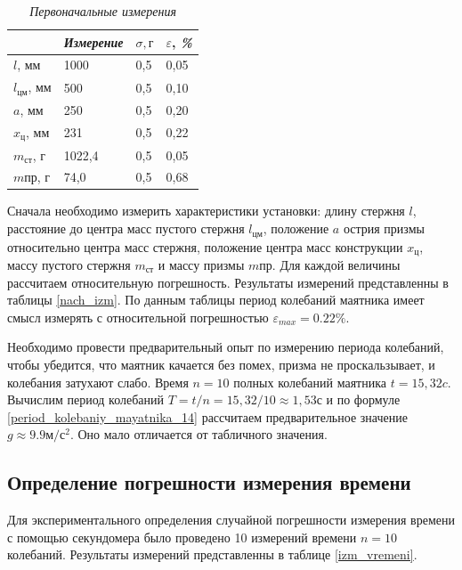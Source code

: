 \documentclass[a4paper,12pt]{article}
\begin{document}
\begin{table}[]
\caption{\textit{Первоначальные измерения}}
\label{nach_izm}
\begin{center}
	\begin{tabular}{|l|l|l|l|}
	\hline
                       & \textit{Измерение} & $\sigma, г$   & $\varepsilon$, \textit{\%} \\ \hline
	$l$, мм  & 1000      & 0,5 & 0,05  \\ \hline
	$l_{\text{цм}}$, мм & 500       & 0,5 & 0,10  \\ \hline
	$a$, мм                  & 250       & 0,5 & 0,20  \\ \hline
	$x_{\text{ц}}$, мм                 & 231       & 0,5 & 0,22  \\ \hline
	$m_{\text{ст}}$, г & 1022,4    & 0,5 & 0,05  \\ \hline
	$m{\text{пр}}$, г  & 74,0      & 0,5 & 0,68  \\ \hline
	\end{tabular}
\end{center}
\end{table}

Сначала необходимо измерить характеристики установки: длину стержня $l$, расстояние до центра масс пустого стержня $l_{\text{цм}}$, положение $a$ острия призмы относительно центра масс стержня, положение центра масс конструкции $x_{\text{ц}}$, массу пустого стержня $m_{\text{ст}}$ и массу призмы $m{\text{пр}}$. Для каждой величины рассчитаем относительную погрешность. Результаты измерений представленны в таблицы \eqref{nach_izm}. По данным таблицы период колебаний маятника имеет смысл измерять с относительной погрешностью $\varepsilon_{max} = 0.22 \%$.


Необходимо провести предварительный опыт по измерению периода колебаний, чтобы убедится, что маятник качается без помех, призма не проскальзывает, и колебания затухают слабо. Время $n = 10$ полных колебаний маятника $t = 15,32 c$. Вычислим период колебаний $T = t/n = 15,32/10 \approx 1,53 с$ и по формуле \eqref{period_kolebaniy_mayatnika_14} рассчитаем предварительное значение $g \approx 9.9 м/с^2$.  Оно мало отличается от табличного значения.


\subsection{Определение погрешности измерения времени}

Для экспериментального определения случайной погрешности измерения времени с помощью секундомера было проведено 10 измерений времени $n = 10$ колебаний. Результаты измерений представленны в таблице \ref{izm_vremeni}.
\end{document}
